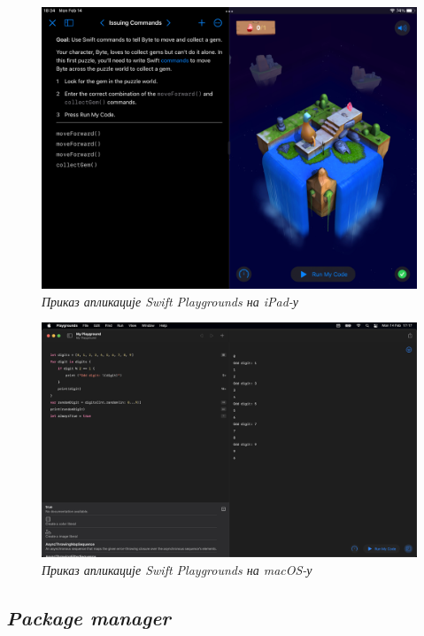 \documentclass[12pt,oneside]{memoir}
\begin{document}
\begin{figure}[H]
\includegraphics[width=1\textwidth]{images/Swift_Playground_iPad.jpeg}
\centering
\caption{\textit{Приказ апликације Swift Playgrounds на iPad-у}}
\label{slika:swift_playground_ipad}
\end{figure}

\begin{figure}[H]
\includegraphics[width=1\textwidth]{images/Swift_Playground_macOS.png}
\centering
\caption{\textit{Приказ апликације Swift Playgrounds на macOS-у}}
\label{slika:swift_playground_macos}
\end{figure}

\subsection{\textit{Package manager}}
\end{document}
